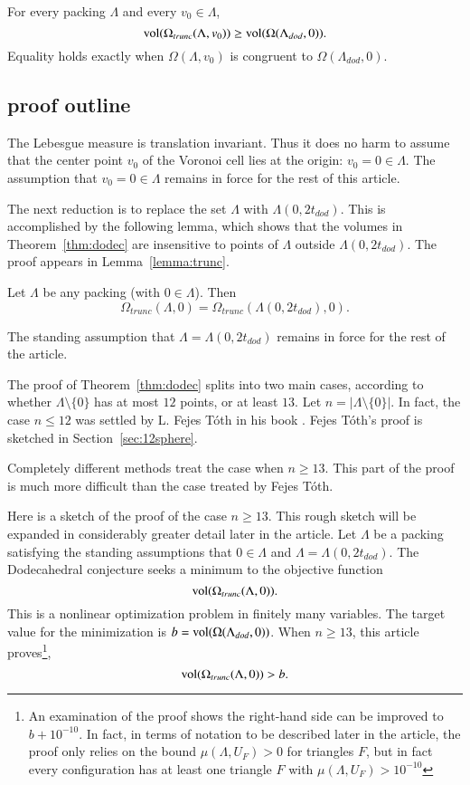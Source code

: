 \begin{theorem}\label{thm:dodec}
For every packing $\Lambda$ and every $v_0\in\Lambda$,
   $$
   {\operatorname{vol}}(\Omega_{trunc}(\Lambda,v_0))\ge {\operatorname{vol}}(\Omega(\Lambda_{dod},0)).
   $$
Equality holds exactly when $\Omega(\Lambda,v_0)$ is congruent to
$\Omega(\Lambda_{dod},0)$.
\end{theorem}





\subsection{proof outline}

The Lebesgue measure is translation invariant.  Thus it does no
harm to assume that the center point $v_0$ of the Voronoi cell
lies at the origin: $v_0 = 0 \in \Lambda$.  The assumption that
$v_0=0 \in\Lambda$ remains in force for the rest of this article.


The next reduction is to replace the set $\Lambda$ with $\Lambda(0,2t_{dod})$.
This is accomplished by the following lemma, which shows that the
volumes in Theorem~\ref{thm:dodec} are insensitive to points of $\Lambda$
outside $\Lambda(0,2t_{dod})$.  The proof appears in Lemma~\ref{lemma:trunc}.


\begin{lemma} Let $\Lambda$ be any packing (with $0\in \Lambda$).
Then
$$\Omega_{trunc}(\Lambda,0) = \Omega_{trunc}(\Lambda(0,2t_{dod}),0).$$
\end{lemma}

The standing assumption that $\Lambda=\Lambda(0,2t_{dod})$ remains in force
for the rest of the article.

The proof of Theorem~\ref{thm:dodec}
splits into two main cases, according to whether
$\Lambda\setminus\{0\}$ has at most $12$ points, or at least $13$.
Let $n=|\Lambda\setminus\{0\}|$.  In fact, the case $n\le 12$ was
settled by L. Fejes T\'oth in his book \cite{Toth2}.  Fejes T\'oth's proof
is sketched in Section~\ref{sec:12sphere}.

Completely different methods treat the case when $n\ge 13$.  
This part of the proof is
much more difficult than the case treated by Fejes T\'oth.

Here is a sketch of the proof of the case $n\ge 13$.   This
rough sketch will be expanded in considerably greater detail later
in the article.
Let $\Lambda$ be a packing satisfying the standing assumptions
that $0\in\Lambda$ and $\Lambda = \Lambda(0,2t_{dod})$.
The Dodecahedral conjecture seeks a minimum to the objective function 
$$
{\operatorname{vol}}(\Omega_{trunc}(\Lambda,0)).
$$
This is a nonlinear optimization problem in finitely many variables.
The target value for the minimization is $b={\operatorname{vol}}(\Omega(\Lambda_{dod},0))$.  When $n\ge 13$, this article proves\footnote{An examination of the proof shows the right-hand side can be improved to $b+10^{-10}$.  In fact, in terms of notation to be described later in the article, the proof only
relies on the bound $\mu(\Lambda,U_F) >0$ for triangles $F$, but in fact every configuration has at least one triangle $F$ with $\mu(\Lambda,U_F) > 10^{-10}$},
   $$
   {\operatorname{vol}}(\Omega_{trunc}(\Lambda,0))  > b.
   $$



